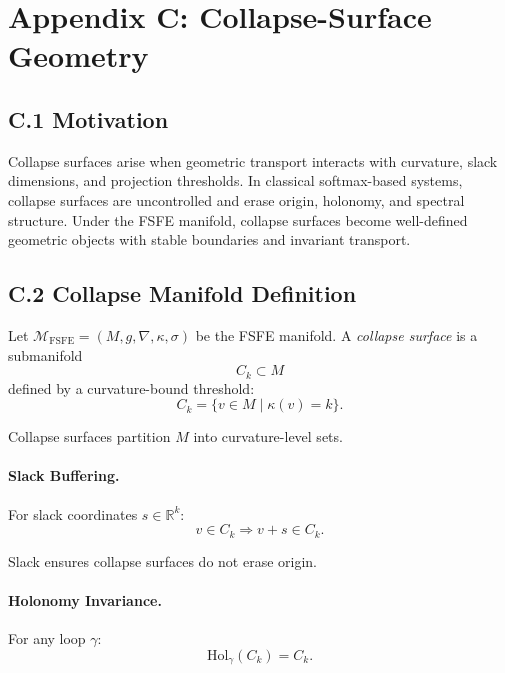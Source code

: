 
\appendix
\section{Appendix C: Collapse-Surface Geometry}
\label{appendix:collapsesurface}

\subsection{C.1 Motivation}

Collapse surfaces arise when geometric transport interacts with curvature,
slack dimensions, and projection thresholds. In classical softmax-based
systems, collapse surfaces are uncontrolled and erase origin, holonomy, and
spectral structure. Under the FSFE manifold, collapse surfaces become
well-defined geometric objects with stable boundaries and invariant transport.

\subsection{C.2 Collapse Manifold Definition}

Let $\mathcal{M}_{\mathrm{FSFE}} = (M, g, \nabla, \kappa, \sigma)$ be the FSFE
manifold. A \emph{collapse surface} is a submanifold
\[
C_k \subset M
\]
defined by a curvature-bound threshold:
\[
C_k = \{ v \in M \mid \kappa(v) = k \}.
\]

Collapse surfaces partition $M$ into curvature-level sets.

\paragraph{Slack Buffering.}
For slack coordinates $s \in \mathbb{R}^k$:
\[
v \in C_k \Rightarrow v + s \in C_k.
\]

Slack ensures collapse surfaces do not erase origin.

\paragraph{Holonomy Invariance.}
For any loop $\gamma$:
\[
\mathrm{Hol}_\gamma(C_k) = C_k.
\]

